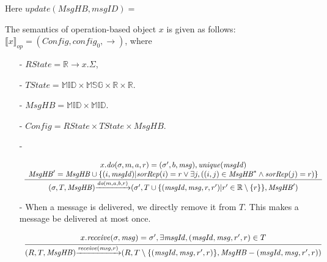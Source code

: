 Here $\mathit{update}(\mathit{MsgHB},\mathit{msgID}) = $


The semantics of operation-based object $x$ is given as follows: $\llbracket x \rrbracket_{\mathit{op}} = (\mathit{Config},\mathit{config}_0,\rightarrow)$, where

\begin{itemize}
\setlength{\itemsep}{0.5pt}
\item[-] $\mathit{RState} = \mathbb{R} \rightarrow x.\Sigma$,

\item[-] $\mathit{TState} = \mathbb{MID} \times \mathbb{MSG} \times \mathbb{R} \times \mathbb{R}$.

\item[-] $\mathit{MsgHB} = \mathbb{MID} \times \mathbb{MID}$.

\item[-] $\mathit{Config} = \mathit{RState} \times \mathit{TState} \times \mathit{MsgHB}$.

\item[-]

$\begin{array}{l c}
   \bigfrac{
   \begin{array}{c}
     x.\mathit{do}(\sigma,m,a,r) = (\sigma',b,\mathit{msg}), \mathit{unique}(\mathit{msgId})\\
     \mathit{MsgHB}' = \mathit{MsgHB} \cup \{ (i,\mathit{msgId}) \vert \mathit{sorRep}(i) = r \vee \exists j, ( (i,j) \in \mathit{MsgHB}^* \wedge \mathit{sorRep}(j) = r) \}
   \end{array}}
     {(\sigma,T,\mathit{MsgHB}) {\xrightarrow{\mathit{do}(m,a,b,r)}} (\sigma',T \cup \{ (\mathit{msgId},\mathit{msg},r,r') \vert r' \in \mathbb{R} \setminus \{ r \} \},\mathit{MsgHB}')}
\end{array}$

\item[-] When a message is delivered, we directly remove it from $T$. This makes a message be delivered at most once.

$\begin{array}{l c}
   \bigfrac{
   \begin{array}{c}
      x.\mathit{receive}(\sigma,\mathit{msg}) = \sigma',\exists \mathit{msgId},(\mathit{msgId},\mathit{msg},r',r) \in T
   \end{array}}
     {(R,T,\mathit{MsgHB}) {\xrightarrow{\mathit{receive}(\mathit{msg},r)}} (R,T \setminus \{ (\mathit{msgId},\mathit{msg},r',r) \},\mathit{MsgHB} - (\mathit{msgId},\mathit{msg},r',r) )}
\end{array}$
\end{itemize}


